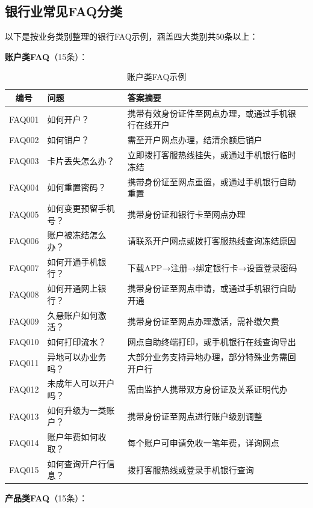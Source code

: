 \subsection{银行业常见FAQ分类}

以下是按业务类别整理的银行FAQ示例，涵盖四大类别共50条以上：

\textbf{账户类FAQ}（15条）：

\begin{table}[H]
\centering
\small
\begin{tabular}{clp{7cm}}
\toprule
\textbf{编号} & \textbf{问题} & \textbf{答案摘要} \\
\midrule
FAQ001 & 如何开户？ & 携带有效身份证件至网点办理，或通过手机银行在线开户 \\
FAQ002 & 如何销户？ & 需至开户网点办理，结清余额后销户 \\
FAQ003 & 卡片丢失怎么办？ & 立即拨打客服热线挂失，或通过手机银行临时冻结 \\
FAQ004 & 如何重置密码？ & 携带身份证至网点重置，或通过手机银行自助重置 \\
FAQ005 & 如何变更预留手机号？ & 携带身份证和银行卡至网点办理 \\
FAQ006 & 账户被冻结怎么办？ & 请联系开户网点或拨打客服热线查询冻结原因 \\
FAQ007 & 如何开通手机银行？ & 下载APP→注册→绑定银行卡→设置登录密码 \\
FAQ008 & 如何开通网上银行？ & 携带身份证至网点申请，或通过手机银行自助开通 \\
FAQ009 & 久悬账户如何激活？ & 携带身份证至网点办理激活，需补缴欠费 \\
FAQ010 & 如何打印流水？ & 网点自助终端打印，或手机银行在线查询导出 \\
FAQ011 & 异地可以办业务吗？ & 大部分业务支持异地办理，部分特殊业务需回开户行 \\
FAQ012 & 未成年人可以开户吗？ & 需由监护人携带双方身份证及关系证明代办 \\
FAQ013 & 如何升级为一类账户？ & 携带身份证至网点进行账户级别调整 \\
FAQ014 & 账户年费如何收取？ & 每个账户可申请免收一笔年费，详询网点 \\
FAQ015 & 如何查询开户行信息？ & 拨打客服热线或登录手机银行查询 \\
\bottomrule
\end{tabular}
\caption{账户类FAQ示例}
\end{table}

\textbf{产品类FAQ}（15条）：

